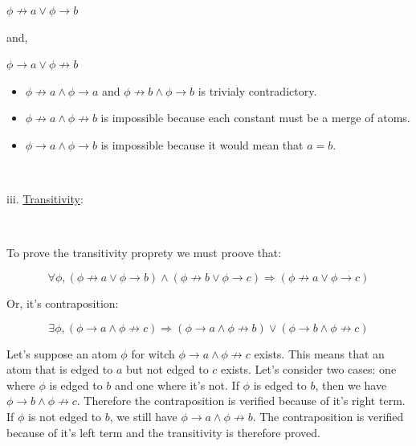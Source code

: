 \documentclass[a4paper, 11pt]{article}
\begin{document}
\begin{center}
    $\phi \not\rightarrow a \lor \phi \rightarrow b$
\end{center}

and,

\begin{center}
    $\phi \rightarrow a \lor \phi \not\rightarrow b$
\end{center}

\begin{itemize}
    \item $\phi \not\rightarrow a \land \phi \rightarrow a$ and $\phi \not\rightarrow b \land \phi \rightarrow b$ is trivialy contradictory.
    \item $\phi \not\rightarrow a \land \phi \not\rightarrow b$ is impossible because each constant must be a merge of atoms.
    \item $\phi \rightarrow a \land \phi \rightarrow b$ is impossible because it would mean that $a=b$.
\end{itemize}

\

iii. \underline{Transitivity}:

\

To prove the transitivity proprety we must proove that:

\begin{equation*}
    \forall \phi, (\phi \not\rightarrow a \lor \phi \rightarrow b) \land (\phi \not\rightarrow b \lor \phi \rightarrow c) \Rightarrow (\phi \not\rightarrow a \lor \phi \rightarrow c) 
\end{equation*}

Or, it's contraposition:

\begin{equation*}
    \exists \phi, (\phi \rightarrow a \land \phi \not\rightarrow c) \Rightarrow (\phi \rightarrow a \land \phi \not\rightarrow b) \lor (\phi \rightarrow b \land \phi \not\rightarrow c) 
\end{equation*}

Let's suppose an atom $\phi$ for witch $\phi \rightarrow a \land \phi \not\rightarrow c$ exists. This means that an atom that is edged to $a$ but not edged to $c$ exists. Let's consider two cases: one where $\phi$ is edged to $b$ and one where it's not. If $\phi$ is edged to $b$, then we have $\phi \rightarrow b \land \phi \not\rightarrow c$. Therefore the contraposition is verified because of it's right term. If $\phi$ is not edged to $b$, we still have $\phi \rightarrow a \land \phi \not\rightarrow b$. The contraposition is verified because of it's left term and the transitivity is therefore proved. 
\end{document}
